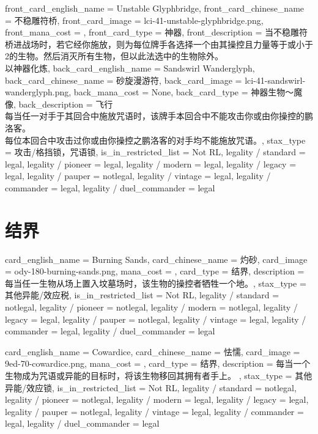 \documentclass[lang = cn, color = black, 10pt]{AllThatStax}
\begin{document}
\mfcard
{
	front_card_english_name = {Unstable Glyphbridge},
	front_card_chinese_name = {不稳雕符桥},
	front_card_image = lci-41-unstable-glyphbridge.png,
	front_mana_cost = ,
	front_card_type = 神器,
	front_description = {当不稳雕符桥进战场时，若它经你施放，则为每位牌手各选择一个由其操控且力量等于或小于2的生物。然后消灭所有生物，但以此法选中的生物除外。\\
以神器化炼},
	back_card_english_name = {Sandswirl Wanderglyph},
	back_card_chinese_name = {砂旋漫游符},
	back_card_image = lci-41-sandswirl-wanderglyph.png,
	back_mana_cost = None,
	back_card_type = 神器生物～魔像,
	back_description = {飞行\\
每当任一对手于其回合中施放咒语时，该牌手本回合中不能攻击你或由你操控的鹏洛客。\\
每位本回合中攻击过你或由你操控之鹏洛客的对手均不能施放咒语。},
	stax_type = 攻击/格挡锁，咒语锁,
	is_in_restricted_list = Not RL,
	legality / standard = legal,
	legality / pioneer = legal,
	legality / modern = legal,
	legality / legacy = legal,
	legality / pauper = notlegal,
	legality / vintage = legal,
	legality / commander = legal,
	legality / duel_commander = legal
}

\section{结界}

\card
{
	card_english_name = {Burning Sands},
	card_chinese_name = {灼砂},
	card_image = ody-180-burning-sands.png,
	mana_cost = ,
	card_type = 结界,
	description = {每当任一生物从场上置入坟墓场时，该生物的操控者牺牲一个地。},
	stax_type = 其他异能/效应税,
	is_in_restricted_list = Not RL,
	legality / standard = notlegal,
	legality / pioneer = notlegal,
	legality / modern = notlegal,
	legality / legacy = legal,
	legality / pauper = notlegal,
	legality / vintage = legal,
	legality / commander = legal,
	legality / duel_commander = legal
}

\card
{
	card_english_name = {Cowardice},
	card_chinese_name = {怯懦},
	card_image = 9ed-70-cowardice.png,
	mana_cost = ,
	card_type = 结界,
	description = {每当一个生物成为咒语或异能的目标时，将该生物移回其拥有者手上。 },
	stax_type = 其他异能/效应锁,
	is_in_restricted_list = Not RL,
	legality / standard = notlegal,
	legality / pioneer = notlegal,
	legality / modern = legal,
	legality / legacy = legal,
	legality / pauper = notlegal,
	legality / vintage = legal,
	legality / commander = legal,
	legality / duel_commander = legal
}
\end{document}
